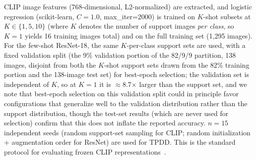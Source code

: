 \documentclass[10pt,a4paper]{article}
\begin{document}
CLIP image features (768-dimensional, L2-normalized) are extracted, and logistic regression (scikit-learn, $C=1.0$, max\_iter=2000) is trained on $K$-shot subsets at $K\in\{1,5,10\}$ (where $K$ denotes the number of support images \emph{per class}, so $K=1$ yields 16 training images total) and on the full training set (1,295 images).
For the few-shot ResNet-18, the same $K$-per-class support sets are used, with a fixed validation split (the 9\% validation portion of the 82/9/9 partition, 138 images, disjoint from both the $K$-shot support sets drawn from the 82\% training portion and the 138-image test set) for best-epoch selection; the validation set is independent of $K$, so at $K{=}1$ it is $\approx$8.7$\times$ larger than the support set, and we note that best-epoch selection on this validation split could in principle favor configurations that generalize well to the validation distribution rather than the support distribution, though the test-set results (which are never used for selection) confirm that this does not inflate the reported accuracy.
$n=15$ independent seeds (random support-set sampling for CLIP; random initialization + augmentation order for ResNet) are used for TPDD.
This is the standard protocol for evaluating frozen CLIP representations~\cite{radford2021learning}.
\end{document}
